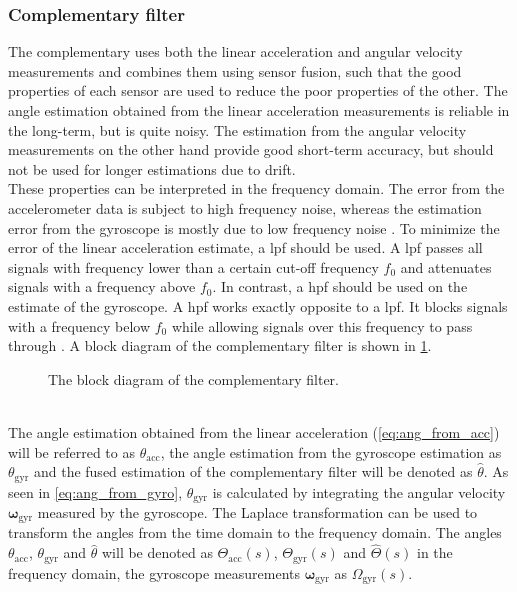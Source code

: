 \subsubsection{Complementary filter}
The complementary uses both the linear acceleration and angular velocity measurements and combines them using sensor fusion, such that the good properties of each sensor are used to reduce the poor properties of the other.
The angle estimation obtained from the linear acceleration measurements is reliable in the long-term, but is quite noisy.
The estimation from the angular velocity measurements on the other hand provide good short-term accuracy, but should not be used for longer estimations due to drift.\\
These properties can be interpreted in the frequency domain.
The error from the accelerometer data is subject to high frequency noise, whereas the estimation error from the gyroscope is mostly due to low frequency noise \cite{2007Colton}.
To minimize the error of the linear acceleration estimate, a \gls{lpf} should be used.
A \gls{lpf} passes all signals with frequency lower than a certain cut-off frequency $f_0$ and attenuates signals with a frequency above $f_0$.
In contrast, a \gls{hpf} should be used on the estimate of the gyroscope.
A \gls{hpf} works exactly opposite to a \gls{lpf}.
It blocks signals with a frequency below $f_0$ while allowing signals over this frequency to pass through \cite{Lyons1996}. A block diagram of the complementary filter is shown in \cref{fig:tikz_complementary_filter}.
\begin{figure}[htb]
	\centering
	
	\caption[Block diagram of the complementary filter]{The block diagram of the complementary filter.}
	\label{fig:tikz_complementary_filter}
\end{figure}
\\The angle estimation obtained from the linear acceleration (\cref{eq:ang_from_acc}) will be referred to as $\theta_\mathrm{acc}$, the angle estimation from the gyroscope estimation as $\theta_\mathrm{gyr}$ and the fused estimation of the complementary filter will be denoted as $\hat{\theta}$.
As seen in \cref{eq:ang_from_gyro}, $\theta_\mathrm{gyr}$ is calculated by integrating the angular velocity $\boldsymbol{\omega}_\mathrm{gyr} $ measured by the gyroscope.
The Laplace transformation can be used to transform the angles from the time domain to the frequency domain.
The angles $\theta_\mathrm{acc}$, $\theta_\mathrm{gyr}$ and $\hat{\theta}$ will be denoted as $\Theta_\mathrm{acc}(s)$, $\Theta_\mathrm{gyr}(s)$ and $\hat{\Theta}(s)$ in the frequency domain, the gyroscope measurements $\boldsymbol{\omega}_\mathrm{gyr} $ as $\Omega_\mathrm{gyr} (s)$.
